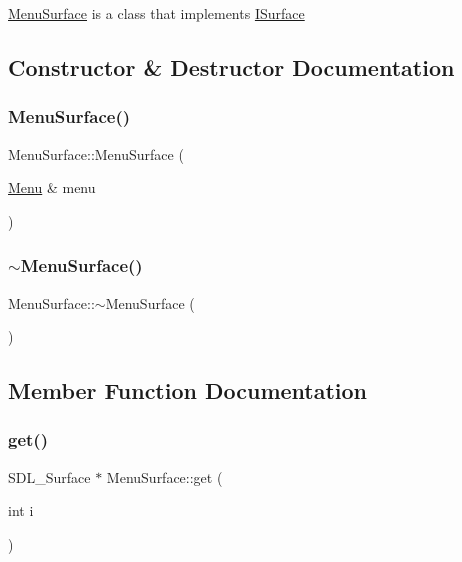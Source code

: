 \mbox{\hyperlink{class_menu_surface}{Menu\+Surface}} is a class that implements \mbox{\hyperlink{class_i_surface}{I\+Surface}} 

\subsection{Constructor \& Destructor Documentation}
\mbox{\label{class_menu_surface_a6eded782a5e3495e20f06194165f8792}} 
\subsubsection{\texorpdfstring{Menu\+Surface()}{MenuSurface()}}
{\footnotesize\ttfamily Menu\+Surface\+::\+Menu\+Surface (\begin{DoxyParamCaption}\item[{\mbox{\hyperlink{class_menu}{Menu}} \&}]{menu }\end{DoxyParamCaption})}

\mbox{\label{class_menu_surface_a1659d1832a1406905f4217143da5ca4f}} 
\subsubsection{\texorpdfstring{$\sim$\+Menu\+Surface()}{~MenuSurface()}}
{\footnotesize\ttfamily Menu\+Surface\+::$\sim$\+Menu\+Surface (\begin{DoxyParamCaption}{ }\end{DoxyParamCaption})\hspace{0.3cm}{\ttfamily [virtual]}}



\subsection{Member Function Documentation}
\mbox{\label{class_menu_surface_a450caa8462abbc0202e2242f1fdd0816}} 
\subsubsection{\texorpdfstring{get()}{get()}}
{\footnotesize\ttfamily S\+D\+L\+\_\+\+Surface $\ast$ Menu\+Surface\+::get (\begin{DoxyParamCaption}\item[{int}]{i }\end{DoxyParamCaption})\hspace{0.3cm}{\ttfamily [virtual]}}



